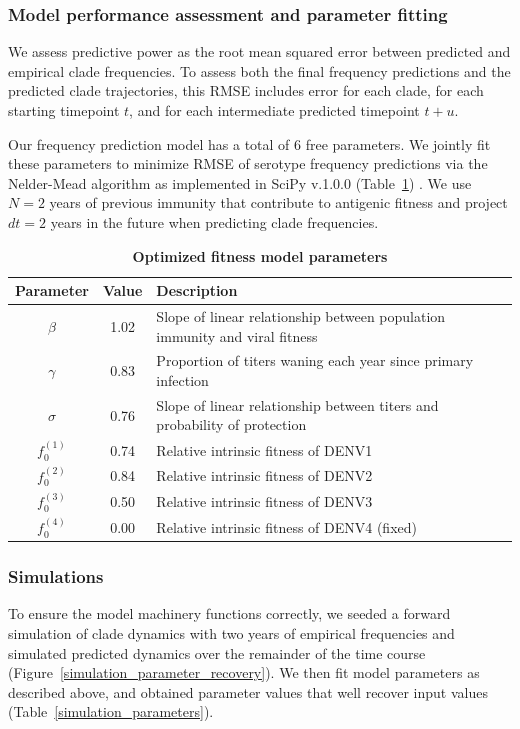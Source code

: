 \documentclass[11pt,oneside,letterpaper]{article}
\begin{document}
\subsubsection*{Model performance assessment and parameter fitting}
We assess predictive power as the root mean squared error between predicted and empirical clade frequencies.
To assess both the final frequency predictions and the predicted clade trajectories, this RMSE includes error for each clade, for each starting timepoint $t$, and for each intermediate predicted timepoint $t+u$.

Our frequency prediction model has a total of 6 free parameters.
We jointly fit these parameters to minimize RMSE of serotype frequency predictions via the Nelder-Mead algorithm as implemented in SciPy v.1.0.0 (Table~\ref{fitness_model_parameters}) \citep{jones2001scipy,gao2012implementing}.
We use $N=2$ years of previous immunity that contribute to antigenic fitness and project $dt=2$ years in the future when predicting clade frequencies.

\begin{table}[ht!]
  \centering
  \caption{
    \textbf{Optimized fitness model parameters}
  }
  \label{fitness_model_parameters}
  \begin{tabular}{c c p{}}
    \hline
    Parameter     & Value & Description \\
    \hline
    $\beta$       & 1.02  & Slope of linear relationship between population immunity and viral fitness \\
    $\gamma$      & 0.83  &  Proportion of titers waning each year since primary infection \\
    $\sigma$      & 0.76  & Slope of linear relationship between titers and probability of protection \\
    $f_{0}^{(1)}$ & 0.74  & Relative intrinsic fitness of DENV1 \\
    $f_{0}^{(2)}$ & 0.84  & Relative intrinsic fitness of DENV2 \\
    $f_{0}^{(3)}$ & 0.50  & Relative intrinsic fitness of DENV3 \\
    $f_{0}^{(4)}$ & 0.00  & Relative intrinsic fitness of DENV4 (fixed) \\
    \hline
  \end{tabular}
\end{table}

\subsubsection*{Simulations}
To ensure the model machinery functions correctly, we seeded a forward simulation of clade dynamics with two years of empirical frequencies and simulated predicted dynamics over the remainder of the time course (Figure~\ref{simulation_parameter_recovery}).
We then fit model parameters as described above, and obtained parameter values that well recover input values (Table~\ref{simulation_parameters}).
\end{document}
